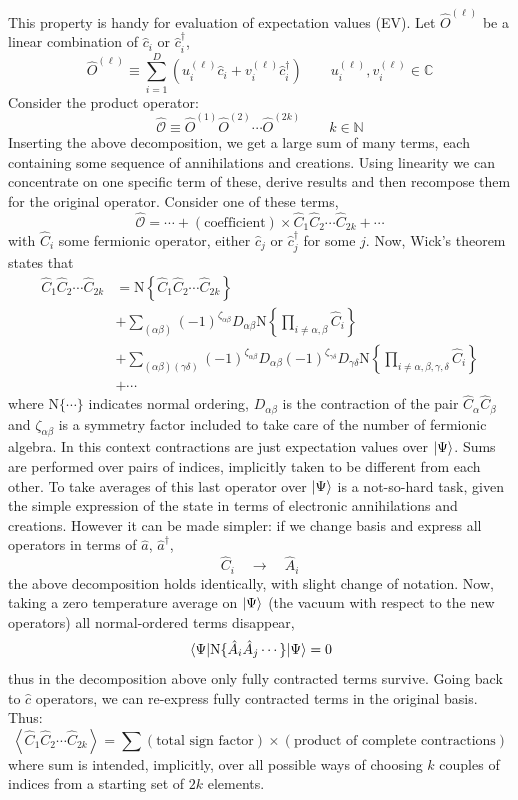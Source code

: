 This property is handy for evaluation of expectation values (EV). Let $\hat O^{(\ell)}$ be a linear combination of $\hat c_i$ or $\hat c_i^\dagger$,
\begin{equation}\label{appeq:slater-Ol}
	\hat O^{(\ell)} \equiv \sum_{i=1}^D \left(u_i^{(\ell)} \hat c_i + v_i^{(\ell)} \hat c_i^\dagger\right)
	\qquad
	u_i^{(\ell)}, v_i^{(\ell)} \in \mathbb{C}
\end{equation}
Consider the product operator:
\[
	\hat{\mathcal{O}} \equiv \hat O^{(1)} \hat O^{(2)} \cdots \hat O^{(2k)}
	\qquad
	k \in \mathbb{N}
\]
Inserting the above decomposition, we get a large sum of many terms, each containing some sequence of annihilations and creations. Using linearity we can concentrate on one specific term of these, derive results and then recompose them for the original operator. Consider one of these terms,
\[
	\hat{\mathcal{O}} = \cdots + (\text{coefficient}) \times \hat C_1 \hat C_2 \cdots \hat C_{2k} + \cdots
\]
with $\hat C_i$ some fermionic operator, either $\hat c_j$ or $\hat c_j^\dagger$ for some $j$. Now, Wick's theorem states that
\[
\begin{aligned}
	\hat C_1 \hat C_2 \cdots \hat C_{2k} &= \mathrm{N} \left\lbrace \hat C_1 \hat C_2 \cdots \hat C_{2k} \right\rbrace \\
	&+ \sum_{(\alpha\beta)} (-1)^{\zeta_{\alpha\beta}} D_{\alpha\beta} \mathrm{N} \left\lbrace \prod_{i \neq \alpha,\beta} \hat C_i \right\rbrace \\
	&+ \sum_{(\alpha\beta)(\gamma\delta)} (-1)^{\zeta_{\alpha\beta}} D_{\alpha\beta} (-1)^{\zeta_{\gamma\delta}} D_{\gamma\delta} \mathrm{N} \left\lbrace \prod_{i \neq \alpha,\beta,\gamma,\delta} \hat C_i \right\rbrace \\
	&+ \cdots
\end{aligned}
\]
where $\mathrm{N}\lbrace \cdots \rbrace$ indicates normal ordering, $D_{\alpha\beta}$ is the contraction of the pair $\hat C_\alpha \hat C_\beta$ and $\zeta_{\alpha\beta}$ is a symmetry factor included to take care of the number of fermionic algebra. In this context contractions are just expectation values over $\ket{\Psi}$. Sums are performed over pairs of indices, implicitly taken to be different from each other. To take averages of this last operator over $\ket{\Psi}$ is a not-so-hard task, given the simple expression of the state in terms of electronic annihilations and creations. However it can be made simpler: if we change basis and express all operators in terms of $\hat a$, $\hat a^\dagger$,
\[
	\hat C_i \quad\to\quad \hat A_i
\]
the above decomposition holds identically, with slight change of notation. Now, taking a zero temperature average on $\ket{\Psi}$ (the vacuum with respect to the new operators) all normal-ordered terms disappear,
\[
	\mel{\Psi}{\mathrm{N}\lbrace \hat A_i \hat A_j \cdots \rbrace}{\Psi} = 0
\]
thus in the decomposition above only fully contracted terms survive. Going back to $\hat c$ operators, we can re-express fully contracted terms in the original basis. Thus:
\[
	\left\langle \hat C_1 \hat C_2 \cdots \hat C_{2k} \right\rangle = \sum (\text{total sign factor}) \times (\text{product of complete contractions})
\]
where sum is intended, implicitly, over all possible ways of choosing $k$ couples of indices from a starting set of $2k$ elements.

